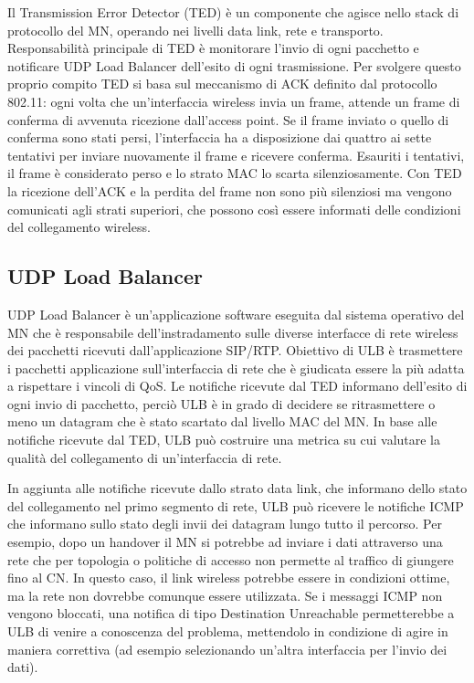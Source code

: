 \documentclass[12pt,a4paper,openright,twoside]{book}
\begin{document}
Il Transmission Error Detector (TED) è un componente che agisce nello
stack di protocollo del MN, operando nei livelli data link, rete e
transporto. Responsabilità principale di TED è monitorare l'invio di
ogni pacchetto e notificare UDP Load Balancer dell'esito di ogni
trasmissione. Per svolgere questo proprio compito TED si basa sul
meccanismo di ACK definito dal protocollo 802.11: ogni volta che
un'interfaccia wireless invia un frame, attende un frame di conferma
di avvenuta ricezione dall'access point. Se il frame inviato o quello
di conferma sono stati persi, l'interfaccia ha a disposizione dai
quattro ai sette tentativi per inviare nuovamente il frame e ricevere
conferma. Esauriti i tentativi, il frame è considerato perso e lo
strato MAC lo scarta silenziosamente. Con TED la ricezione dell'ACK e
la perdita del frame non sono più silenziosi ma vengono comunicati
agli strati superiori, che possono così essere informati delle
condizioni del collegamento wireless.

\subsection{UDP Load Balancer}

UDP Load Balancer è un'applicazione software eseguita dal sistema
operativo del MN che è responsabile dell'instradamento sulle diverse
interfacce di rete wireless dei pacchetti ricevuti dall'applicazione
SIP/RTP. Obiettivo di ULB è trasmettere i pacchetti applicazione
sull'interfaccia di rete che è giudicata essere la più adatta a
rispettare i vincoli di QoS. Le notifiche ricevute dal TED informano
dell'esito di ogni invio di pacchetto, perciò ULB è in grado di
decidere se ritrasmettere o meno un datagram che è stato scartato dal
livello MAC del MN. In base alle notifiche ricevute dal TED, ULB può
costruire una metrica su cui valutare la qualità del collegamento di
un'interfaccia di rete.

In aggiunta alle notifiche ricevute dallo strato data link, che
informano dello stato del collegamento nel primo segmento di rete, ULB
può ricevere le notifiche ICMP che informano sullo stato degli invii
dei datagram lungo tutto il percorso. Per esempio, dopo un handover il
MN si potrebbe ad inviare i dati attraverso una rete che per topologia
o politiche di accesso non permette al traffico di giungere fino al
CN. In questo caso, il link wireless potrebbe essere in condizioni
ottime, ma la rete non dovrebbe comunque essere utilizzata. Se i
messaggi ICMP non vengono bloccati, una notifica di tipo Destination
Unreachable permetterebbe a ULB di venire a conoscenza del problema,
mettendolo in condizione di agire in maniera correttiva (ad esempio
selezionando un'altra interfaccia per l'invio dei dati).
\end{document}

